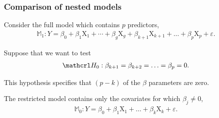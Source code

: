 \documentclass{beamer}
\begin{document}
\begin{frame}
\frametitle{Comparison of nested models}
\bi
\item Consider the \alert{full model} which contains $p$ predictors,
\begin{align*}
\mathbb{M}_1: Y=\beta_0+\beta_1 \mathrm{X}_1 + \cdots + \beta_g \mathrm{X}_g + \beta_{k+1}\mathrm{X}_{k+1} + \ldots + \beta_p \mathrm{X}_p + \varepsilon.
\end{align*}
\item Suppose that we want to test 
\begin{align*}
\Hy_0: \beta_{k+1}=\beta_{k+2}=\ldots=\beta_p=0.
\end{align*}
\item This hypothesis specifies that $(p-k)$ of the $\beta$ parameters are zero.
\item The \alert{restricted model} contains only the covariates for which $\beta_j \neq 0$,
\begin{align*}
\mathbb{M}_0: Y=\beta_0+\beta_1 \mathrm{X}_1 + \ldots + \beta_k \mathrm{X}_k + \varepsilon.
\end{align*}
\ei
\end{frame}
\end{document}
